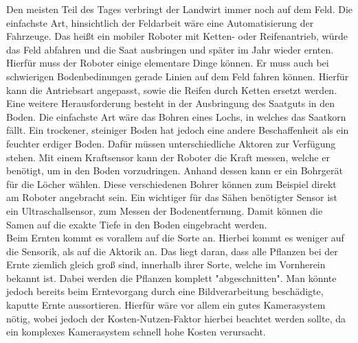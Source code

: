 Den meisten Teil des Tages verbringt der Landwirt immer noch auf dem Feld. Die
einfachste Art, hinsichtlich der Feldarbeit wäre eine Automatisierung der
Fahrzeuge. Das heißt ein mobiler Roboter mit Ketten- oder Reifenantrieb, würde
das Feld abfahren und die Saat ausbringen und später im Jahr wieder ernten. \\
Hierfür muss der Roboter einige elementare Dinge können. Er muss auch bei
schwierigen Bodenbedinungen gerade Linien auf dem Feld fahren können. Hierfür
kann die Antriebsart angepasst, sowie die Reifen durch Ketten ersetzt werden. Eine
weitere Herausforderung besteht in der Ausbringung des Saatguts in den Boden.
Die einfachste Art wäre das Bohren eines Lochs, in welches das Saatkorn fällt.
Ein trockener, steiniger Boden hat jedoch eine andere Beschaffenheit als
ein feuchter erdiger Boden. Dafür müssen unterschiedliche Aktoren zur Verfügung
stehen. Mit einem Kraftsensor kann der Roboter die Kraft messen, welche er
benötigt, um in den Boden vorzudringen. Anhand dessen kann er ein Bohrgerät für
die Löcher wählen. Diese verschiedenen Bohrer können zum Beispiel direkt am
Roboter angebracht sein.\cite{naik2016precision} Ein wichtiger für das Sähen benötigter Sensor ist ein
Ultraschallsensor, zum Messen der Bodenentfernung. Damit können die Samen auf
die exakte Tiefe in den Boden eingebracht werden.\\ Beim Ernten kommt es
vorallem auf die Sorte an. Hierbei kommt es weniger auf die Sensorik, als auf
die Aktorik an. Das liegt daran, dass alle Pflanzen bei der Ernte ziemlich
gleich groß sind, innerhalb ihrer Sorte, welche im Vornherein bekannt ist.
Dabei werden die Pflanzen komplett "abgeschnitten". Man könnte jedoch bereits
beim Erntevorgang durch eine Bildverarbeitung beschädigte, kaputte Ernte
aussortieren. Hierfür wäre vor allem ein gutes Kamerasystem nötig, wobei jedoch der Kosten-Nutzen-Faktor hierbei beachtet werden sollte, da ein komplexes Kamerasystem
schnell hohe Kosten verursacht.
